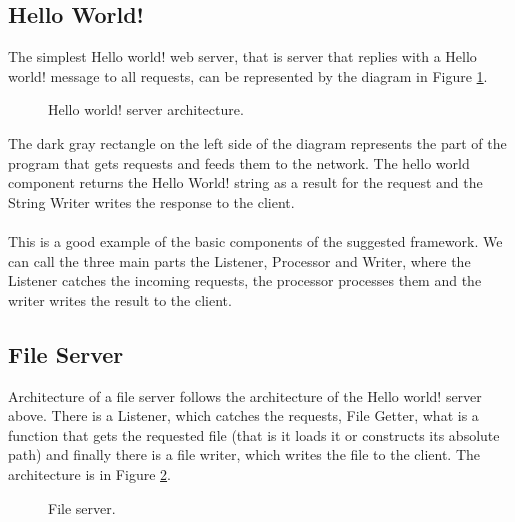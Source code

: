 \documentclass[12pt,a4paper]{article}
\begin{document}
\subsection{Hello World!}
The simplest Hello world! web server, that is server that replies with a 
Hello world! message to all requests, can be represented by the diagram
in Figure \ref{fig:helloWorld}.

\begin{figure}[h]
\centering
{}
\caption[scale=1.0]{Hello world! server architecture.}
\label{fig:helloWorld}
\end{figure}

The dark gray rectangle on the left side of the diagram represents the 
part of the program that gets requests and feeds them to the network.
The hello world component returns the Hello World! string as a result 
for the request and the String Writer writes the response to the client.
\\
\\
This is a good example of the basic components of the suggested framework.
We can call the three main parts the Listener, Processor and Writer, where
the Listener catches the incoming requests, the processor processes them
and the writer writes the result to the client.

\subsection{File Server}
Architecture of a file server follows the architecture of the Hello world!
server above. There is a Listener, which catches the requests,
File Getter, what is a function that gets the requested file (that is it loads it or 
constructs its absolute path) and finally there is a file writer, which
writes the file to the client. The architecture is in Figure \ref{fig:fileServer}.
\\
\begin{figure}[h]
\centering
{}
\caption[scale=1.0]{File server.}
\label{fig:fileServer}
\end{figure}
\end{document}
